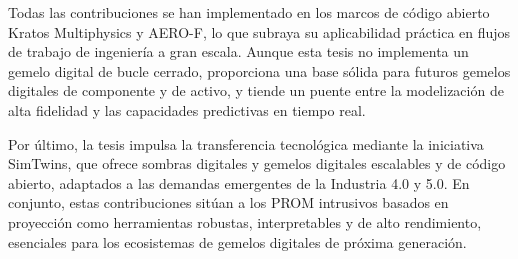 Todas las contribuciones se han implementado en los marcos de código abierto Kratos Multiphysics y AERO-F, lo que subraya su aplicabilidad práctica en flujos de trabajo de ingeniería a gran escala. Aunque esta tesis no implementa un gemelo digital de bucle cerrado, proporciona una base sólida para futuros gemelos digitales de componente y de activo, y tiende un puente entre la modelización de alta fidelidad y las capacidades predictivas en tiempo real.

Por último, la tesis impulsa la transferencia tecnológica mediante la iniciativa SimTwins, que ofrece sombras digitales y gemelos digitales escalables y de código abierto, adaptados a las demandas emergentes de la Industria 4.0 y 5.0. En conjunto, estas contribuciones sitúan a los PROM intrusivos basados en proyección como herramientas robustas, interpretables y de alto rendimiento, esenciales para los ecosistemas de gemelos digitales de próxima generación.

